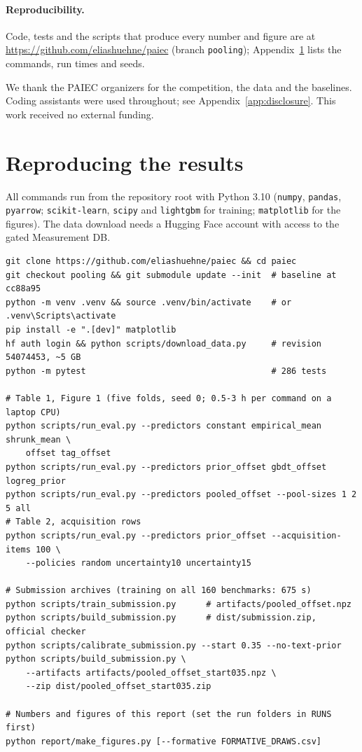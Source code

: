 \documentclass{article}
\newcommand{\repo}{\url{https://github.com/eliashuehne/paiec}}
\newcommand{\code}[1]{\texttt{#1}}
\begin{document}
\paragraph{Reproducibility.} Code, tests and the scripts that produce every number and figure are at \repo{} (branch \code{pooling}); Appendix~\ref{app:repro} lists the commands, run times and seeds.

\begin{ack}
We thank the PAIEC organizers for the competition, the data and the baselines. Coding assistants were used throughout; see Appendix~\ref{app:disclosure}. This work received no external funding.
\end{ack}

{\small


}

\newpage
\appendix

\section{Reproducing the results}
\label{app:repro}

All commands run from the repository root with Python 3.10 (\code{numpy}, \code{pandas}, \code{pyarrow}; \code{scikit-learn}, \code{scipy} and \code{lightgbm} for training; \code{matplotlib} for the figures). The data download needs a Hugging Face account with access to the gated Measurement DB.

\begin{footnotesize}
\begin{verbatim}
git clone https://github.com/eliashuehne/paiec && cd paiec
git checkout pooling && git submodule update --init  # baseline at cc88a95
python -m venv .venv && source .venv/bin/activate    # or .venv\Scripts\activate
pip install -e ".[dev]" matplotlib
hf auth login && python scripts/download_data.py     # revision 54074453, ~5 GB
python -m pytest                                     # 286 tests

# Table 1, Figure 1 (five folds, seed 0; 0.5-3 h per command on a laptop CPU)
python scripts/run_eval.py --predictors constant empirical_mean shrunk_mean \
    offset tag_offset
python scripts/run_eval.py --predictors prior_offset gbdt_offset logreg_prior
python scripts/run_eval.py --predictors pooled_offset --pool-sizes 1 2 5 all
# Table 2, acquisition rows
python scripts/run_eval.py --predictors prior_offset --acquisition-items 100 \
    --policies random uncertainty10 uncertainty15

# Submission archives (training on all 160 benchmarks: 675 s)
python scripts/train_submission.py      # artifacts/pooled_offset.npz
python scripts/build_submission.py      # dist/submission.zip, official checker
python scripts/calibrate_submission.py --start 0.35 --no-text-prior
python scripts/build_submission.py \
    --artifacts artifacts/pooled_offset_start035.npz \
    --zip dist/pooled_offset_start035.zip

# Numbers and figures of this report (set the run folders in RUNS first)
python report/make_figures.py [--formative FORMATIVE_DRAWS.csv]
\end{verbatim}
\end{footnotesize}
\end{document}
